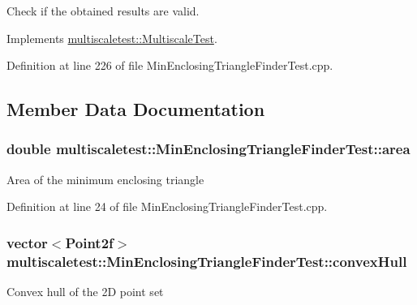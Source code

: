 \-Check if the obtained results are valid. 



\-Implements \hyperlink{classmultiscaletest_1_1MultiscaleTest_a571838b9aa291a62da67733e39268871}{multiscaletest\-::\-Multiscale\-Test}.



\-Definition at line 226 of file \-Min\-Enclosing\-Triangle\-Finder\-Test.\-cpp.



\subsection{\-Member \-Data \-Documentation}
\hypertarget{classmultiscaletest_1_1MinEnclosingTriangleFinderTest_a80c049e5307e5f316ad0b73964ea90bf}{
\subsubsection[{area}]{\setlength{\rightskip}{0pt plus 5cm}double {\bf multiscaletest\-::\-Min\-Enclosing\-Triangle\-Finder\-Test\-::area}}}\label{classmultiscaletest_1_1MinEnclosingTriangleFinderTest_a80c049e5307e5f316ad0b73964ea90bf}
\-Area of the minimum enclosing triangle 

\-Definition at line 24 of file \-Min\-Enclosing\-Triangle\-Finder\-Test.\-cpp.

\hypertarget{classmultiscaletest_1_1MinEnclosingTriangleFinderTest_a309e2484e202fab797520fc15517d95d}{
\subsubsection[{convex\-Hull}]{\setlength{\rightskip}{0pt plus 5cm}vector$<$\-Point2f$>$ {\bf multiscaletest\-::\-Min\-Enclosing\-Triangle\-Finder\-Test\-::convex\-Hull}}}\label{classmultiscaletest_1_1MinEnclosingTriangleFinderTest_a309e2484e202fab797520fc15517d95d}
\-Convex hull of the 2\-D point set 

